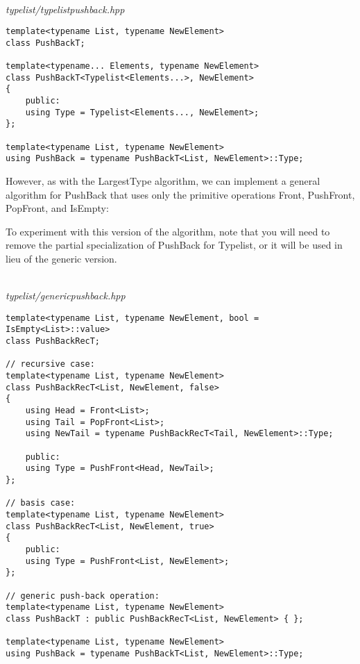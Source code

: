 \hspace*{\fill} \\ %
\noindent
\textit{typelist/typelistpushback.hpp}
\begin{lstlisting}[style=styleCXX]
template<typename List, typename NewElement>
class PushBackT;

template<typename... Elements, typename NewElement>
class PushBackT<Typelist<Elements...>, NewElement>
{
	public:
	using Type = Typelist<Elements..., NewElement>;
};

template<typename List, typename NewElement>
using PushBack = typename PushBackT<List, NewElement>::Type;
\end{lstlisting}

However, as with the LargestType algorithm, we can implement a general algorithm for PushBack that uses only the primitive operations Front, PushFront, PopFront, and IsEmpty:

\begin{tcolorbox}[colback=webgreen!5!white,colframe=webgreen!75!black]
\hspace*{0.75cm}To experiment with this version of the algorithm, note that you will need to remove the partial specialization of PushBack for Typelist, or it will be used in lieu of the generic version.
\end{tcolorbox}

\hspace*{\fill} \\ %
\noindent
\textit{typelist/genericpushback.hpp}
\begin{lstlisting}[style=styleCXX]
template<typename List, typename NewElement, bool = IsEmpty<List>::value>
class PushBackRecT;

// recursive case:
template<typename List, typename NewElement>
class PushBackRecT<List, NewElement, false>
{
	using Head = Front<List>;
	using Tail = PopFront<List>;
	using NewTail = typename PushBackRecT<Tail, NewElement>::Type;
	
	public:
	using Type = PushFront<Head, NewTail>;
};

// basis case:
template<typename List, typename NewElement>
class PushBackRecT<List, NewElement, true>
{
	public:
	using Type = PushFront<List, NewElement>;
};

// generic push-back operation:
template<typename List, typename NewElement>
class PushBackT : public PushBackRecT<List, NewElement> { };

template<typename List, typename NewElement>
using PushBack = typename PushBackT<List, NewElement>::Type;
\end{lstlisting}

